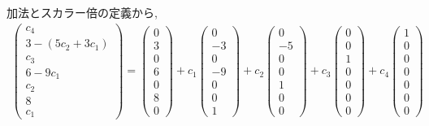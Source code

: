 加法とスカラー倍の定義から,
\begin{align*}
  \begin{pmatrix}
      c_4\\
      3-(5c_2+3c_1)\\
      c_3\\
      6-9c_1\\
      c_2\\
      8\\
      c_1
  \end{pmatrix}
  =
  \begin{pmatrix}
      0\\
      3\\
      0\\
      6\\
      0\\
      8\\
      0
  \end{pmatrix}
  +c_1
  \begin{pmatrix}
      0\\
      -3\\
      0\\
      -9\\
      0\\
      0\\
      1
  \end{pmatrix}
  +c_2
  \begin{pmatrix}
      0\\
      -5\\
      0\\
      0\\
      1\\
      0\\
      0
  \end{pmatrix}
  +c_3
  \begin{pmatrix}
      0\\
      0\\
      1\\
      0\\
      0\\
      0\\
      0
  \end{pmatrix}
  +c_4
  \begin{pmatrix}
      1\\
      0\\
      0\\
      0\\
      0\\
      0\\
      0
  \end{pmatrix}
\end{align*}
